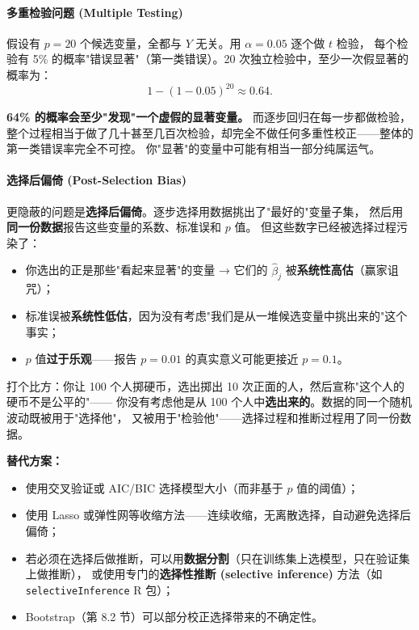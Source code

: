 \paragraph{多重检验问题 (Multiple Testing)}

假设有 $p = 20$ 个候选变量，全都与 $Y$ 无关。用 $\alpha = 0.05$ 逐个做 $t$ 检验，
每个检验有 5\% 的概率"错误显著"（第一类错误）。20 次独立检验中，至少一次假显著的概率为：
\[
    1 - (1 - 0.05)^{20} \approx 0.64.
\]

\textbf{64\% 的概率会至少"发现"一个虚假的显著变量。} 而逐步回归在每一步都做检验，
整个过程相当于做了几十甚至几百次检验，却完全不做任何多重性校正——整体的第一类错误率完全不可控。
你"显著"的变量中可能有相当一部分纯属运气。

\paragraph{选择后偏倚 (Post-Selection Bias)}

更隐蔽的问题是\textbf{选择后偏倚}。逐步选择用数据挑出了"最好的"变量子集，
然后用\textbf{同一份数据}报告这些变量的系数、标准误和 $p$ 值。
但这些数字已经被选择过程污染了：

\begin{itemize}
    \item 你选出的正是那些"看起来显著"的变量 → 它们的 $\hat{\beta}_j$ 被\textbf{系统性高估}（赢家诅咒）；
    \item 标准误被\textbf{系统性低估}，因为没有考虑"我们是从一堆候选变量中挑出来的"这个事实；
    \item $p$ 值\textbf{过于乐观}——报告 $p=0.01$ 的真实意义可能更接近 $p=0.1$。
\end{itemize}

打个比方：你让 100 个人掷硬币，选出掷出 10 次正面的人，然后宣称"这个人的硬币不是公平的"——
你没有考虑他是从 100 个人中\textbf{选出来的}。数据的同一个随机波动既被用于"选择他"，
又被用于"检验他"——选择过程和推断过程用了同一份数据。

\textbf{替代方案：}
\begin{itemize}
    \item 使用交叉验证或 AIC/BIC 选择模型大小（而非基于 $p$ 值的阈值）；
    \item 使用 Lasso 或弹性网等收缩方法——连续收缩，无离散选择，自动避免选择后偏倚；
    \item 若必须在选择后做推断，可以用\textbf{数据分割}（只在训练集上选模型，只在验证集上做推断），
    或使用专门的\textbf{选择性推断 (selective inference)} 方法（如 \texttt{selectiveInference} R 包）；
    \item Bootstrap（第 8.2 节）可以部分校正选择带来的不确定性。
\end{itemize}

